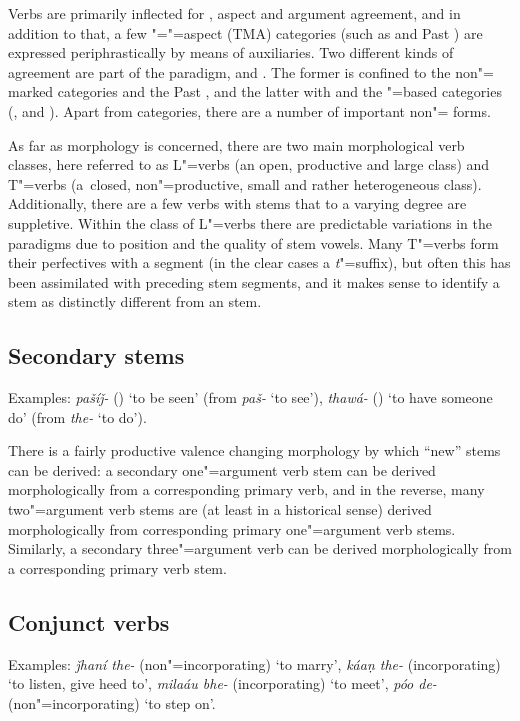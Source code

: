Verbs are primarily inflected for , aspect and argument agreement, and in addition to that, a few "="=aspect (TMA) categories (such as  and Past ) are expressed periphrastically by means of auxiliaries. Two different kinds of agreement are part of the paradigm,  and . The former is confined to the non"= marked categories  and the Past , and the latter with  and the "=based categories (,  and ). Apart from   categories, there are a number of important non"= forms.


As far as  morphology is concerned, there are two main morphological verb classes, here referred to as L"=verbs (an open, productive and large class) and T"=verbs (a~closed, non"=productive, small and rather heterogeneous class). Additionally, there are a few verbs with stems that to a varying degree are suppletive. Within the class of L"=verbs there are predictable variations in the  paradigms due to  position and the quality of stem vowels. Many T"=verbs form their perfectives with a  segment (in the clear cases a \textit{t}"=suffix), but often this has been assimilated with preceding stem segments, and it makes sense to identify a  stem as distinctly different from an  stem.


\subsection{Secondary stems}
\label{subsec:3b-3-1}
Examples: \textit{pašíǰ-} () `to be seen' (from \textit{paš-} `to see'), \textit{thawá-} () `to have someone do' (from \textit{the-} `to do').


There is a fairly productive valence changing morphology by which “new” stems can be derived: a secondary one"=argument verb stem can be derived morphologically from a corresponding primary  verb, and in the reverse, many two"=argument verb stems are (at least in a historical sense) derived morphologically from corresponding primary one"=argument verb stems. Similarly, a secondary three"=argument verb can be derived morphologically from a corresponding primary  verb stem. 


\subsection{Conjunct verbs}
\label{subsec:3b-3-2}
Examples: \textit{ǰhaní the-} (non"=incorporating) `to marry', \textit{káaṇ the-} (incorporating) `to listen, give heed to', \textit{milaáu bhe-} (incorporating) `to meet', \textit{póo de-} (non"=incorporating) `to step on'.


